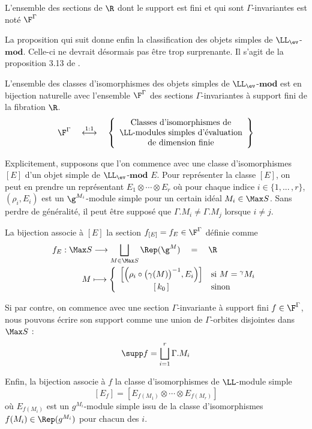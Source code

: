 \begin{Def} L'ensemble des sections de $\R$ dont le support est fini et qui sont $\Gamma$-invariantes est noté $\F^\Gamma$  
\end{Def}


La proposition qui suit donne enfin la classification des objets simples de $\LL_{\ev}$-$\mathbf{mod}$. Celle-ci ne devrait désormais pas être trop surprenante. Il s'agit de la proposition 3.13 de \cite{LauTCA}.

\begin{Prop}\label{classmodulesev} L'ensemble des classes d'isomorphismes des objets simples de $\LL_{\ev}$-$\mathbf{mod}$ est en bijection naturelle avec l'ensemble $\F^\Gamma$ des sections $\Gamma$-invariantes à support fini de la fibration $\R$.
\begin{equation*} 
\F^\Gamma \quad \stackrel{1:1}{\longleftrightarrow} \quad
\left\{\begin{array}{c} \text{Classes d'isomorphismes de}\\
\LL\text{-modules simples d'évaluation}\\ \text{de dimension finie} \end{array}\right\}
\end{equation*}

Explicitement, supposons que l'on commence avec une classe d'isomorphismes $[E]$ d'un objet simple de $\LL_{\ev}$-$\mathbf{mod}$ $E$. Pour représenter la classe $[E]$, on peut en prendre un représentant $E_1 \otimes \cdots \otimes E_r$ où pour chaque indice $i \in \{1,...\,,r\}$, $(\rho_i,E_i)$ est un $\g^{M_i}$-module simple pour un certain idéal $M_i \in \Max S$. Sans perdre de généralité, il peut être supposé que $\Gamma.M_i \neq \Gamma.M_j$ lorsque $i \neq j$.

La bijection associe à $[E]$ la section $f_{[E]} = f_E \in \F^\Gamma$ définie comme
\begin{align*}
f_E : \; &\Max S \longrightarrow \bigsqcup_{M \in \Max S} \Rep(\g^M) \quad = \quad \R\\
 &\quad\;\; M \longmapsto \left\{
\begin{array}{cl} \left[ \Big(\rho_i \circ \big(\gamma(M)\big)^{-1}, E_i \Big) \right] & \text{si } M = {}^\gamma M_i\\
\text{$[\,k_0\,]$} & \text{sinon}\\
\end{array} \right.
\end{align*}

Si par contre, on commence avec une section $\Gamma$-invariante à support fini $f \in \F^\Gamma$, nous pouvons écrire son support comme une union de $\Gamma$-orbites disjointes dans $\Max S$ :
$$ \supp f = \bigsqcup_{i=1}^r \Gamma.M_i $$

Enfin, la bijection associe à $f$ la classe d'isomorphismes de $\LL$-module simple
$$ [E_f] = \left[E_{f(M_1)} \otimes \cdots \otimes E_{f(M_r)}\right] $$
où $E_{f(M_i)}$ est un $g^{M_i}$-module simple issu de la classe d'isomorphismes $f(M_i) \in \Rep(g^{M_i})$ pour chacun des $i$.
\end{Prop}

